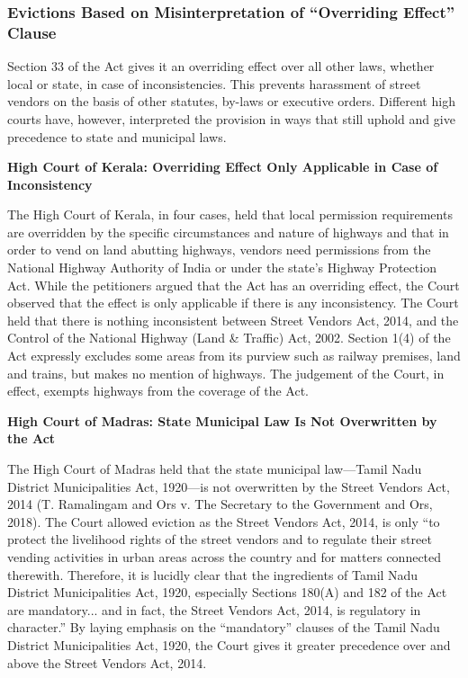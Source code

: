 \documentclass[a4paper, 12pt, twoside]{article}
\begin{document}
{\subsubsection*{Evictions Based on Misinterpretation of “Overriding Effect” Clause}

Section 33 of the Act gives it an overriding effect over all other laws, whether local or state, in case of inconsistencies. This prevents harassment of street vendors on the basis of other statutes, by-laws or executive orders. Different high courts have, however, interpreted the provision in ways that still uphold and give precedence to state and municipal laws.

\textbf{High Court of Kerala: Overriding Effect Only Applicable in Case of Inconsistency}

The High Court of Kerala, in four cases, held that local permission requirements are overridden by the specific circumstances and nature of highways and that in order to vend on land abutting highways, vendors need permissions from the National Highway Authority of India or under the state's Highway Protection Act. While the petitioners argued that the Act has an overriding effect, the Court observed that the effect is only applicable if there is any inconsistency. The Court held that there is nothing inconsistent between Street Vendors Act, 2014, and the Control of the National Highway (Land \& Traffic) Act, 2002. Section 1(4) of the Act expressly excludes some areas from its purview such as railway premises, land and trains, but makes no mention of highways. The judgement of the Court, in effect, exempts highways from the coverage of the Act.

\textbf{High Court of Madras: State Municipal Law Is Not Overwritten by the Act}

The High Court of Madras held that the state municipal law—Tamil Nadu District Municipalities Act, 1920—is not overwritten by the Street Vendors Act, 2014 (T. Ramalingam and Ors v. The Secretary to the Government and Ors, 2018). The Court allowed eviction as the Street Vendors Act, 2014, is only “to protect the livelihood rights of the street vendors and to regulate their street vending activities in urban areas across the country and for matters connected therewith. Therefore, it is lucidly clear that the ingredients of Tamil Nadu District Municipalities Act, 1920, especially Sections 180(A) and 182 of the Act  are mandatory... and in fact, the Street Vendors Act, 2014, is regulatory in character.” By laying emphasis on the “mandatory” clauses of the Tamil Nadu District Municipalities Act, 1920, the Court gives it greater precedence over and above the Street Vendors Act, 2014.

}
\end{document}
